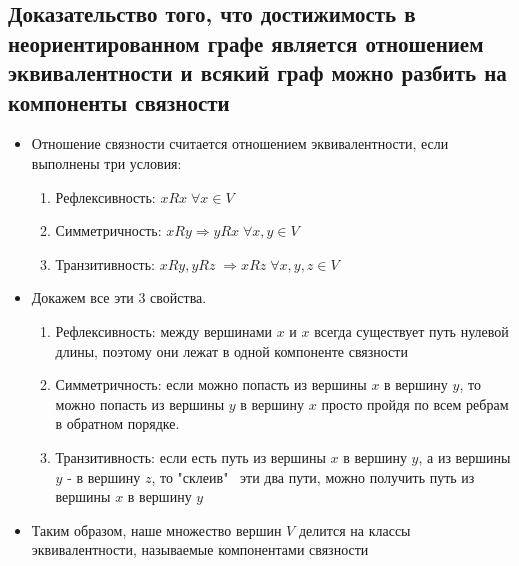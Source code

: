 \documentclass{article}
\begin{document}
    \subsection{Доказательство того, что достижимость в неориентированном графе является отношением эквивалентности и всякий граф можно разбить на компоненты связности}
    \begin{itemize}
        \item
            Отношение связности считается отношением эквивалентности, если выполнены три условия:
            \begin{enumerate}
            \item Рефлексивность: $xRx \; \forall x \in V$
            \item Симметричность: $xRy \Rightarrow yRx \; \forall x, y \in V$
            \item Транзитивность: $xRy, yRz \; \Rightarrow xRz \; \forall x, y, z \in V$
            \end{enumerate}
        \item
        Докажем все эти 3 свойства.
            \begin{enumerate}
            \item 
            Рефлексивность: между вершинами $x$ и $x$ всегда существует путь нулевой длины, поэтому они лежат в одной компоненте связности

            \item 
            Симметричность: если можно попасть из вершины $x$ в вершину $y$, то можно попасть из вершины $y$ в вершину $x$ просто пройдя по всем ребрам в обратном порядке. 

            \item 
            Транзитивность: если есть путь из вершины $x$ в вершину $y$, а из вершины $y$ - в вершину $z$, то "склеив" \, эти два пути, можно получить путь из вершины $x$ в вершину $y$
            
            \end{enumerate}
        \item 
        Таким образом, наше множество вершин $V$ делится на классы эквивалентности, называемые компонентами связности 

    \end{itemize}
\end{document}
